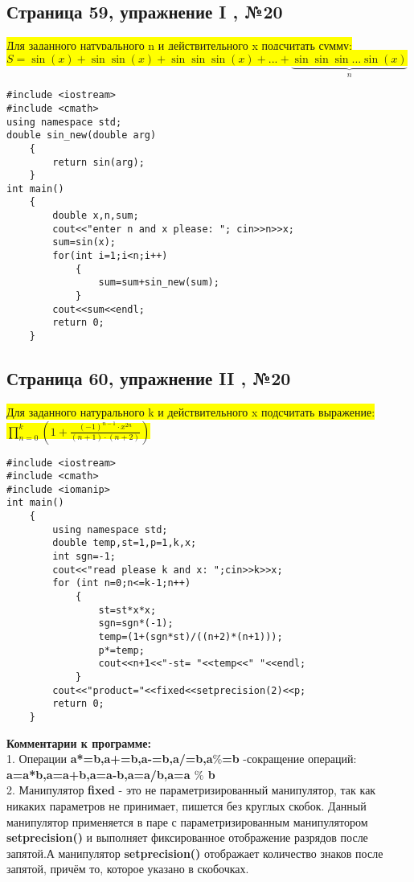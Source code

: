 \documentclass[11pt]{article}
\begin{document}
\begin{flushleft}
\newpage
\begin{center}
\section{Страница 59, упражнение I , №20}
\colorbox{yellow}{Для заданного натурального n и действительного x подсчитать сумму: }\\
\colorbox{yellow}{$S=\sin(x)+\sin\sin(x)+\sin\sin\sin(x)+...+\underbrace{\sin\sin\sin...\sin(x) }_{n}$ }
\end{center}
\begin{lstlisting}
#include <iostream>
#include <cmath>
using namespace std;
double sin_new(double arg)
	{
		return sin(arg);
	}
int main()
	{
		double x,n,sum;
		cout<<"enter n and x please: "; cin>>n>>x;
		sum=sin(x);
		for(int i=1;i<n;i++)
			{
				sum=sum+sin_new(sum);
			}
		cout<<sum<<endl;
		return 0;
	}
\end{lstlisting}

\newpage
\begin{center}
\section{Страница 60, упражнение II , №20}
\colorbox{yellow}{Для заданного натурального k и действительного x подсчитать выражение: $\prod\limits_{n=0}^k (1+ \frac{(-1)^{n-1}\cdot x^{2n}}{(n+1)\cdot(n+2)})$ }\\
\end{center}
\begin{lstlisting}
#include <iostream>
#include <cmath>
#include <iomanip>
int main()
	{
		using namespace std;
		double temp,st=1,p=1,k,x;
		int sgn=-1;
		cout<<"read please k and x: ";cin>>k>>x;
		for (int n=0;n<=k-1;n++)
			{
				st=st*x*x;
				sgn=sgn*(-1);
				temp=(1+(sgn*st)/((n+2)*(n+1)));
				p*=temp;
				cout<<n+1<<"-st= "<<temp<<" "<<endl;
			}
		cout<<"product="<<fixed<<setprecision(2)<<p;
		return 0;
	}
\end{lstlisting}

\textbf{Комментарии к программе:} \\
1. Операции \textbf{a*=b,a+=b,a-=b,a/=b,a$\%$=b} -сокращение операций: \textbf{a=a*b,a=a+b,a=a-b,a=a/b,a=a $\%$ b} \\
2. Манипулятор \textbf{fixed} - это не параметризированный манипулятор, так как никаких параметров не принимает, пишется без круглых скобок. Данный манипулятор применяется в паре с параметризированным манипулятором  \textbf{setprecision()} и выполняет фиксированное отображение разрядов после запятой.А манипулятор \textbf{setprecision()} отображает количество знаков после запятой,  причём то, которое указано в скобочках.
\newpage
\begin{center}

\end{center}
\end{flushleft}
\end{document}
